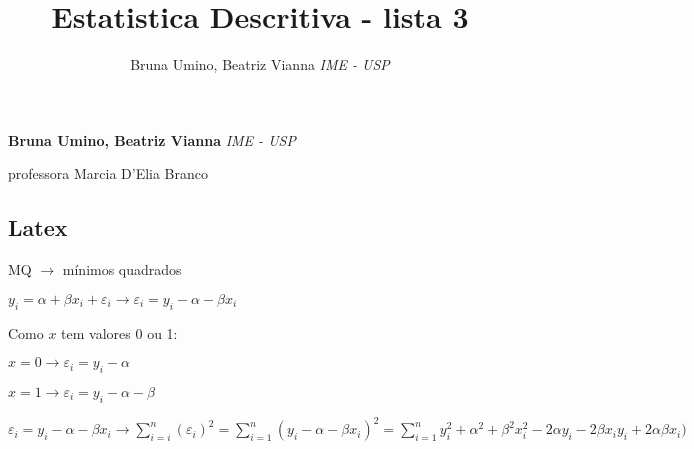 \documentclass[11pt,]{article}
\title{Estatistica Descritiva - lista 3  }
\author{\Large Bruna Umino, Beatriz Vianna\vspace{0.05in} \newline\normalsize\emph{IME - USP}  }
\date{}
\newcommand*{\authorfont}{\fontfamily{phv}\selectfont}
\renewenvironment{abstract}
 {{%
    \setlength{\leftmargin}{0mm}
    \setlength{\rightmargin}{\leftmargin}%
  }%
  \relax}
 {\endlist}
\begin{document}
	
%

{%
\setlength{\parindent}{0pt}
\thispagestyle{plain}
{\fontsize{18}{20}\selectfont\raggedright 
\maketitle  %

}

{
   \vskip 13.5pt\relax \normalsize\fontsize{11}{12} 
\textbf{\authorfont Bruna Umino, Beatriz Vianna} \hskip 15pt \emph{\small IME - USP}   

}

}







\begin{abstract}

    \hbox{\vrule height .2pt width 39.14pc}

    \vskip 8.5pt %

\noindent professora Marcia D'Elia Branco


    \hbox{\vrule height .2pt width 39.14pc}


\end{abstract}


\vskip 6.5pt

\noindent  \subsection{Latex}\label{latex}

MQ \(\rightarrow\) mínimos quadrados

\(y_{i}= \alpha + \beta x_{i} + \varepsilon_{i} \rightarrow \varepsilon_{i} = y_{i} - \alpha - \beta x_{i}\)

Como \(x\) tem valores 0 ou 1:

\(x = 0 \rightarrow \varepsilon_{i} = y_{i}- \alpha\)

\(x= 1 \rightarrow \varepsilon_{i} = y_{i} - \alpha - \beta\)

\(\varepsilon_{i} = y_{i} - \alpha - \beta x_{i} \rightarrow \sum_{i=i}^n ( \varepsilon_{i})^2 = \sum_{i=1}^n ( y_{i} - \alpha - \beta x_{i} )^2 = \sum_{i=1}^n y_{i}^2 + \alpha^2 + \beta^2 x_{i}^2 - 2 \alpha y_{i} - 2 \beta x_{i} y_{i} + 2 \alpha \beta x_{i})\)
\end{document}
